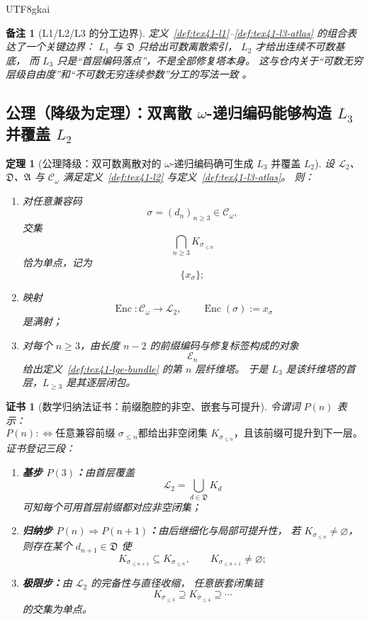 \documentclass[12pt]{article}
\newtheorem{theorem}{定理}[section]
\newtheorem{remark}{备注}[section]
\newtheorem{Certificate}{证书}[section]
\newcommand{\Ltwo}{\mathcal{L}_2}
\newcommand{\Dpair}{\mathfrak D}
\newcommand{\CodeSpace}{\mathcal{C}_\omega}
\newcommand{\Enc}{\operatorname{Enc}}
\begin{document}
\begin{CJK*}{UTF8}{gkai}
\begin{remark}[L1/L2/L3 的分工边界]
定义~\ref{def:tex41-l1}--\ref{def:tex41-l3-atlas} 的组合表达了一个关键边界：
$L_1$ 与 $\Dpair$ 只给出\emph{可数离散索引}，
$L_2$ 才给出\emph{连续不可数基底}，
而 $L_3$ 只是“首层编码落点”，不是全部修复塔本身。
这与仓内关于“可数无穷层级自由度”和“不可数无穷连续参数”分工的写法一致
\cite{GaoZheng2025GFramework,RepoTex32HoleObstruction}。
\end{remark}

\subsection{公理（降级为定理）：双离散 $\omega$-递归编码能够构造 $L_3$ 并覆盖 $L_2$}
\label{subsec:tex41-ch1-axiom-downgrade}

\begin{theorem}[公理降级：双可数离散对的 $\omega$-递归编码确可生成 $L_3$ 并覆盖 $L_2$]
\label{thm:tex41-axiom-downgrade}
设 $\Ltwo$、$\Dpair$、$\mathfrak A$ 与 $\CodeSpace$ 满足定义~\ref{def:tex41-l2} 与定义~\ref{def:tex41-l3-atlas}。
则：
\begin{enumerate}
  \item 对任意兼容码
  \[
    \sigma=(d_n)_{n\ge 3}\in\CodeSpace,
  \]
  交集
  \[
    \bigcap_{n\ge 3}K_{\sigma_{\le n}}
  \]
  恰为单点，记为
  \[
    \{x_\sigma\};
  \]
  \item 映射
  \[
    \Enc:\CodeSpace\to\Ltwo,\qquad
    \Enc(\sigma):=x_\sigma
  \]
  是满射；
  \item 对每个 $n\ge 3$，由长度 $n-2$ 的前缀编码与修复标签构成的对象
  \[
    \mathcal E_n
  \]
  给出定义~\ref{def:tex41-lge-bundle} 的第 $n$ 层纤维塔。
  于是 $L_3$ 是该纤维塔的首层，$L_{\ge 3}$ 是其逐层闭包。
\end{enumerate}
\end{theorem}

\begin{Certificate}[数学归纳法证书：前缀胞腔的非空、嵌套与可提升]
\label{cert:tex41-axiom-downgrade}
令谓词 $P(n)$ 表示：
\[
  P(n)
  :
  \Longleftrightarrow
  \text{任意兼容前缀 }\sigma_{\le n}
  \text{都给出非空闭集 }K_{\sigma_{\le n}}
  \text{，且该前缀可提升到下一层。}
\]
证书登记三段：
\begin{enumerate}
  \item \textbf{基步 $P(3)$：}由首层覆盖
  \[
    \Ltwo=\bigcup_{d\in\Dpair}K_d
  \]
  可知每个可用首层前缀都对应非空闭集；
  \item \textbf{归纳步 $P(n)\Rightarrow P(n+1)$：}由后继细化与局部可提升性，
  若 $K_{\sigma_{\le n}}\neq\varnothing$，则存在某个 $d_{n+1}\in\Dpair$ 使
  \[
    K_{\sigma_{\le n+1}}\subseteq K_{\sigma_{\le n}},
    \qquad
    K_{\sigma_{\le n+1}}\neq\varnothing;
  \]
  \item \textbf{极限步：}由 $\Ltwo$ 的完备性与直径收缩，
  任意嵌套闭集链
  \[
    K_{\sigma_{\le 3}}\supseteq K_{\sigma_{\le 4}}\supseteq\cdots
  \]
  的交集为单点。
\end{enumerate}
\end{Certificate}


\end{CJK*}
\end{document}
